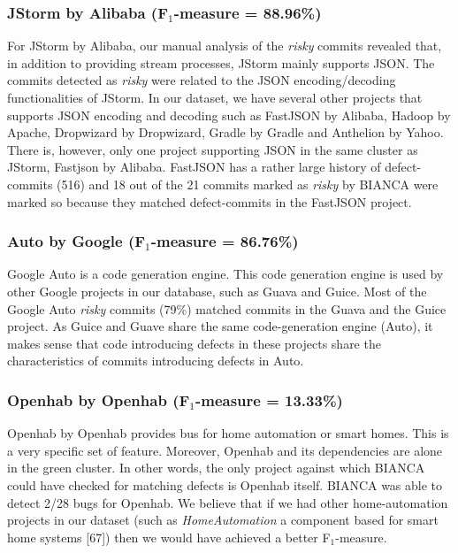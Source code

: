 \documentclass[conference]{IEEEtran}
\begin{document}
\subsubsection{JStorm by Alibaba (F$_1$-measure =
88.96\%)}\label{jstorm-by-alibaba-fux5f1-measure-88.96}

For JStorm by Alibaba, our manual analysis of the \emph{risky} commits
revealed that, in addition to providing stream processes, JStorm mainly
supports JSON. The commits detected as \emph{risky} were related to the
JSON encoding/decoding functionalities of JStorm. In our dataset, we
have several other projects that supports JSON encoding and decoding
such as FastJSON by Alibaba, Hadoop by Apache, Dropwizard by Dropwizard,
Gradle by Gradle and Anthelion by Yahoo. There is, however, only one
project supporting JSON in the same cluster as JStorm, Fastjson by
Alibaba. FastJSON has a rather large history of defect-commits (516) and
18 out of the 21 commits marked as \emph{risky} by BIANCA were marked so
because they matched defect-commits in the FastJSON project.

\subsubsection{Auto by Google (F$_1$-measure =
86.76\%)}\label{auto-by-google-fux5f1-measure-86.76}

Google Auto is a code generation engine. This code generation engine is
used by other Google projects in our database, such as Guava and Guice.
Most of the Google Auto \emph{risky} commits (79\%) matched commits in
the Guava and the Guice project. As Guice and Guave share the same
code-generation engine (Auto), it makes sense that code introducing
defects in these projects share the characteristics of commits
introducing defects in Auto.

\subsubsection{Openhab by Openhab (F$_1$-measure =
13.33\%)}\label{openhab-by-openhab-fux5f1-measure-13.33}

Openhab by Openhab provides bus for home automation or smart homes. This
is a very specific set of feature. Moreover, Openhab and its
dependencies are alone in the green cluster. In other words, the only
project against which BIANCA could have checked for matching defects is
Openhab itself. BIANCA was able to detect 2/28 bugs for Openhab. We
believe that if we had other home-automation projects in our dataset
(such as \emph{HomeAutomation} a component based for smart home systems
{[}67{]}) then we would have achieved a better F$_1$-measure.
\end{document}
